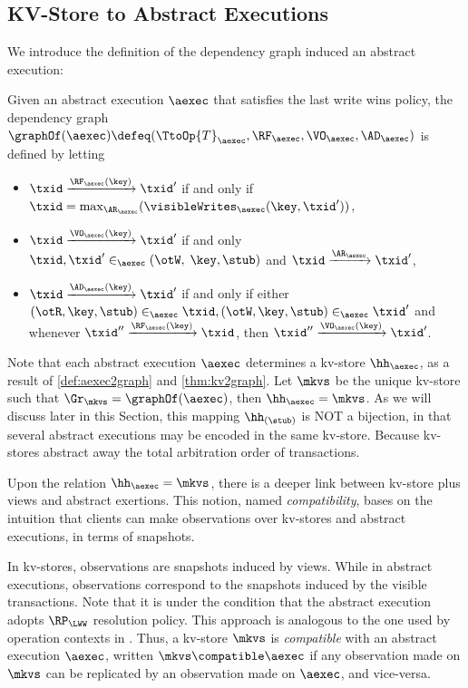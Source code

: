 \subsection{KV-Store to Abstract Executions}
\label{app:aexec2kv}
\label{sec:thm:aexec2kv-compatible-proof}

We introduce the definition of the dependency graph induced an abstract execution:

\begin{definition}
\label{def:aexec2graph}
Given an abstract execution $\aexec$ that satisfies the last write wins policy,
the dependency graph $\graphOf(\aexec) \defeq (\TtoOp{T}_{\aexec}, \RF_{\aexec}, 
\VO_{\aexec}, \AD_{\aexec})$ is defined by letting
\begin{itemize}
\item $\txid \xrightarrow{\RF_{\aexec}(\key)} \txid'$ if and only if 
$\txid = \max_{\AR_{\aexec}}(\visibleWrites_{\aexec}(\key, \txid'))$, 
\item $\txid \xrightarrow{\VO_{\aexec}(\key)} \txid'$ if and only 
$\txid, \txid' \in_{\aexec} (\otW, \;\key, \stub)$ 
and $\txid \xrightarrow{\AR_{\aexec}} \txid'$,
\item $\txid \xrightarrow{\AD_{\aexec}(\key)} \txid'$ if and only if either 
$(\otR, \key, \stub) \in_{\aexec} \txid, (\otW, \key, \stub) \in_{\aexec} \txid'$ and 
whenever $\txid'' \xrightarrow{\RF_{\aexec}(\key)} \txid$, 
then $\txid'' \xrightarrow{\VO_{\aexec}(\key)} \txid'$.
\end{itemize}
\end{definition}

Note that each abstract execution $\aexec$ determines a kv-store $\hh_{\aexec}$,
as a result of \cref{def:aexec2graph} and \cref{thm:kv2graph}. 
Let $\mkvs$ be the unique kv-store such that $\Gr_{\mkvs} = \graphOf(\aexec)$, then $\hh_{\aexec} = \mkvs$. 
As we will discuss later in this Section,
this mapping $\hh_{(\stub)}$ is NOT a bijection, 
in that several abstract executions may be encoded in the same kv-store.
Because kv-stores abstract away the total arbitration order of transactions.

Upon the relation \( \hh_{\aexec} = \mkvs \),
there is a deeper link between kv-store plus views and abstract exertions.
This notion, named \emph{compatibility}, bases on the intuition that 
clients can make observations over kv-stores and abstract executions, in terms of snapshots.

In kv-stores, observations are snapshots induced by views. 
While in abstract executions, observations correspond to the snapshots induced by the visible transactions.
Note that it is under the condition that the abstract execution adopts $\RP_{\LWW}$ resolution policy.
This approach is analogous to the one used by operation contexts in \cite{repldatatypes}.
Thus, a kv-store $\mkvs$ is \emph{compatible} with an abstract execution $\aexec$, written \( \mkvs \compatible \aexec \)
if any observation made on $\mkvs$ can be replicated by an observation made on $\aexec$, and vice-versa. 

